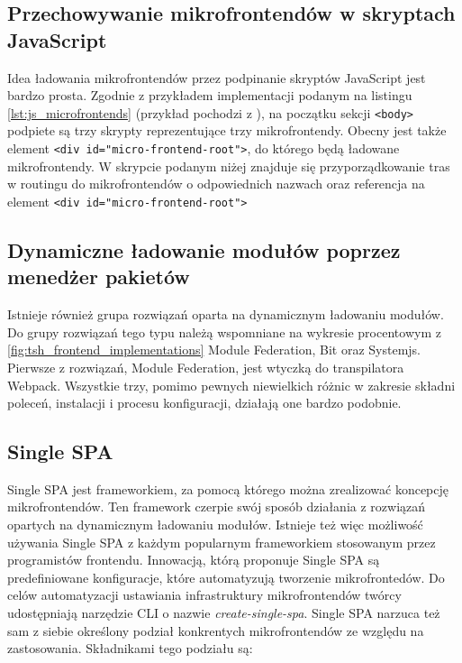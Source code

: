 \documentclass{SGGW-thesis}
\begin{document}
    

    \subsection{Przechowywanie mikrofrontendów w skryptach JavaScript}
    Idea ładowania mikrofrontendów przez podpinanie skryptów JavaScript jest bardzo prosta. Zgodnie z przykładem implementacji podanym na listingu \cref{lst:js_microfrontends} (przykład pochodzi z \cite{fowler_2019}), na początku sekcji \lstinline{<body>} podpiete są trzy skrypty reprezentujące trzy mikrofrontendy. Obecny jest także element \lstinline{<div id="micro-frontend-root">}, do którego będą ładowane mikrofrontendy. W skrypcie podanym niżej znajduje się przyporządkowanie tras w routingu do mikrofrontendów o odpowiednich nazwach oraz referencja na element \lstinline{<div id="micro-frontend-root">}

    

    \subsection{Dynamiczne ładowanie modułów poprzez menedżer pakietów}
    Istnieje również grupa rozwiązań oparta na dynamicznym ładowaniu modułów. Do grupy rozwiązań tego typu należą wspomniane na wykresie procentowym z  \cref{fig:tsh_frontend_implementations} Module Federation, Bit oraz Systemjs. Pierwsze z rozwiązań, Module Federation, jest wtyczką do transpilatora Webpack. Wszystkie trzy, pomimo pewnych niewielkich różnic w zakresie składni poleceń, instalacji i procesu konfiguracji, działają one bardzo podobnie. 

    \subsection{Single SPA}
    Single SPA jest frameworkiem, za pomocą którego można zrealizować koncepcję mikrofrontendów. Ten framework czerpie swój sposób działania z rozwiązań opartych na dynamicznym ładowaniu modułów. Istnieje też więc możliwość używania Single SPA z każdym popularnym frameworkiem stosowanym przez programistów frontendu. Innowacją, którą proponuje Single SPA są predefiniowane konfiguracje, które automatyzują tworzenie mikrofrontedów. Do celów automatyzacji ustawiania infrastruktury mikrofrontendów twórcy udostępniają narzędzie CLI o nazwie \textit{create-single-spa}. Single SPA narzuca też sam z siebie określony podział konkrentych mikrofrontendów ze względu na zastosowania. Składnikami tego podziału są:
\end{document}
